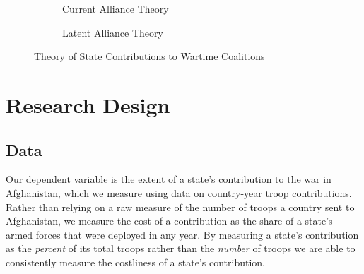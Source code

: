 \documentclass[12pt,letterpaper]{article}
\begin{document}
		\begin{figure}[H]
		\begin{subfigure}{.5\textwidth}
			\caption{Current Alliance Theory}
			\label{fig:theory_old}
		\end{subfigure}
		\begin{subfigure}{.5\textwidth}
		\caption{Latent Alliance Theory}
		\label{fig:theory_new}
		\end{subfigure}
		\caption{Theory of State Contributions to Wartime Coalitions}
		\label{fig:theory}
		\end{figure}

\section{Research Design}
	\subsection{Data}
		
		Our dependent variable is the extent of a state's contribution to the war in Afghanistan, which we measure using data on country-year troop contributions. Rather than relying on a raw measure of the number of troops a country sent to Afghanistan, we measure the cost of a contribution as the share of a state's armed forces that were deployed in any year. By measuring a state's contribution as the \emph{percent} of its total troops rather than the \emph{number} of troops we are able to consistently measure the costliness of a state's contribution. 
		
\end{document}
